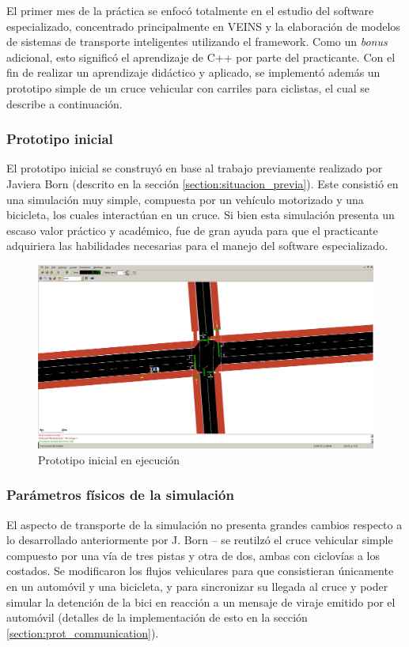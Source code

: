 \documentclass[11pt,letterpaper]{article}
\begin{document}
El primer mes de la práctica se enfocó totalmente en el estudio del software especializado, concentrado principalmente en VEINS y la elaboración de modelos de sistemas de transporte inteligentes utilizando el framework. Como un \emph{bonus} adicional, esto significó el aprendizaje de C++ por parte del practicante. Con el fin de realizar un aprendizaje didáctico y aplicado, se implementó además un prototipo simple de un cruce vehicular con carriles para ciclistas, el cual se describe a continuación.

\subsubsection{Prototipo inicial}

El prototipo inicial se construyó en base al trabajo previamente realizado por Javiera Born (descrito en la sección \ref{section:situacion_previa}). Este consistió en una simulación muy simple, compuesta por un vehículo motorizado y una bicicleta, los cuales interactúan en un cruce. Si bien esta simulación presenta un escaso valor práctico y académico, fue de gran ayuda para que el practicante adquiriera las habilidades necesarias para el manejo del software especializado.

\begin{figure}[ht]
  \centering
  \includegraphics[width=\linewidth]{prototipo_inicial.png}
  \caption{Prototipo inicial en ejecución}
  \label{fig:sumo_prototype}
\end{figure}

\subsubsection{Parámetros físicos de la simulación}

El aspecto de transporte de la simulación no presenta grandes cambios respecto a lo desarrollado anteriormente por J. Born -- se reutilzó el cruce vehicular simple compuesto por una vía de tres pistas y otra de dos, ambas con ciclovías a los costados. Se modificaron los flujos vehiculares para que consistieran únicamente en un automóvil y una bicicleta, y para sincronizar su llegada al cruce y poder simular la detención de la bici en reacción a un mensaje de viraje emitido por el automóvil (detalles de la implementación de esto en la sección \ref{section:prot_communication}).
\end{document}
